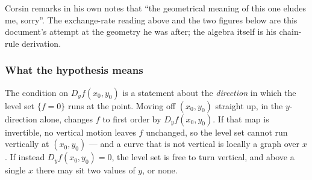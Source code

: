 \begin{ainote}
Corsin remarks in his own notes that ``the geometrical meaning of this one eludes me, sorry''.
The exchange-rate reading above and the two figures below are this document's attempt at the
geometry he was after; the algebra itself is his chain-rule derivation.
\end{ainote}

\subsubsection*{What the hypothesis means}

The condition on $D_yf(x_0,y_0)$ is a statement about the \emph{direction} in which the level
set $\{f=0\}$ runs at the point. Moving off $(x_0,y_0)$ straight up, in the $y$-direction alone,
changes $f$ to first order by $D_yf(x_0,y_0)$. If that map is invertible, no vertical motion
leaves $f$ unchanged, so the level set cannot run vertically at $(x_0,y_0)$ --- and a curve that
is not vertical is locally a graph over $x$. If instead $D_yf(x_0,y_0)=0$, the level set is free
to turn vertical, and above a single $x$ there may sit two values of $y$, or none.

